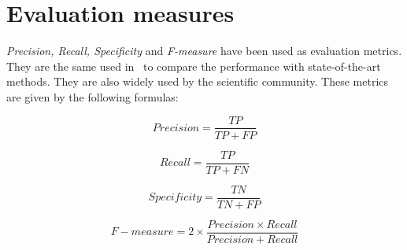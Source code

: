 \section{Evaluation measures}
\label{sec:evaluation_measures}

\textit{Precision, Recall, Specificity} and \textit{F-measure} have been used as evaluation metrics. They are the same used in~\citet{brancati:17} to compare the performance with state-of-the-art methods. They are also widely used by the scientific community. These metrics are given by the following formulas:

\begin{equation*}
    Precision = \frac{TP}{TP + FP}
    \label{eq:precision}
\end{equation*}

\begin{equation*}
    Recall = \frac{TP}{TP + FN}
    \label{eq:recall}
\end{equation*}

\begin{equation*}
    Specificity = \frac{TN}{TN + FP}
    \label{eq:specificity}
\end{equation*}

\begin{equation*}
    F-measure = 2 \times \frac{Precision \times Recall}{Precision + Recall}
    \label{eq:fmeasure}
\end{equation*}


